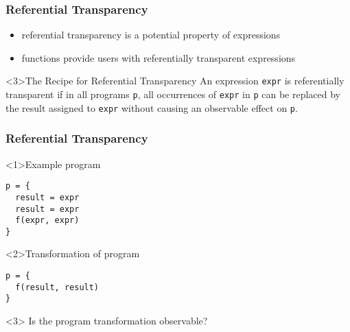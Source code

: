 \begin{frame}
\frametitle{Referential Transparency}
\begin{itemize}
  \item<1> referential transparency is a potential property of expressions
  \item<2> functions provide users with referentially transparent expressions
\end{itemize}
\begin{block}<3>{The Recipe for Referential Transparency}
An expression \lstinline$expr$ is referentially transparent if in all programs \lstinline$p$, all occurrences of \lstinline$expr$ in \lstinline$p$ can be replaced by the result assigned to \lstinline$expr$ without causing an observable effect on \lstinline$p$.
\end{block}
\end{frame}

\begin{frame}[fragile]
\frametitle{Referential Transparency}
\begin{block}<1>{Example program}
\begin{lstlisting}
p = {
  result = expr
  result = expr
  f(expr, expr)
}
\end{lstlisting}
\end{block}
\begin{block}<2>{Transformation of program}
\begin{lstlisting}
p = {
  f(result, result)
}
\end{lstlisting}
\end{block}
\begin{block}<3>{}
Is the program transformation observable?
\end{block}
\end{frame}
